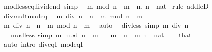 \begin{isabellebody}
\endisatagproof
{\isafoldproof}%
%
\isadelimproof
\isanewline
%
\endisadelimproof
\isanewline
{}\isamarkupfalse%
\ mod{\isacharunderscore}{\kern0pt}less{\isacharunderscore}{\kern0pt}eq{\isacharunderscore}{\kern0pt}dividend\ {\isacharbrackleft}{\kern0pt}simp{\isacharbrackright}{\kern0pt}{\isacharcolon}{\kern0pt}\isanewline
\ \ {\isachardoublequoteopen}m\ mod\ n\ {\isasymle}\ m{\isachardoublequoteclose}\ \ m\ n\ {\isacharcolon}{\kern0pt}{\isacharcolon}{\kern0pt}\ nat\isanewline
%
\isadelimproof
%
\endisadelimproof
%
\isatagproof
{}\isamarkupfalse%
\ {\isacharparenleft}{\kern0pt}rule\ add{\isacharunderscore}{\kern0pt}leD{}{\isacharparenright}{\kern0pt}\isanewline
\ \ \isamarkupfalse%
\ div{\isacharunderscore}{\kern0pt}mult{\isacharunderscore}{\kern0pt}mod{\isacharunderscore}{\kern0pt}eq\ \isamarkupfalse%
\ {\isachardoublequoteopen}m\ div\ n\ {\isacharasterisk}{\kern0pt}\ n\ {\isacharplus}{\kern0pt}\ m\ mod\ n\ {\isacharequal}{\kern0pt}\ m{\isachardoublequoteclose}\ \isacommand{{\isachardot}{\kern0pt}}\isamarkupfalse%
\isanewline
\ \ \isamarkupfalse%
\ \isamarkupfalse%
\ {\isachardoublequoteopen}m\ div\ n\ {\isacharasterisk}{\kern0pt}\ n\ {\isacharplus}{\kern0pt}\ m\ mod\ n\ {\isasymle}\ m{\isachardoublequoteclose}\ \isamarkupfalse%
\ auto\isanewline
{}\isamarkupfalse%
%
\endisatagproof
{\isafoldproof}%
%
\isadelimproof
\isanewline
%
\endisadelimproof
\isanewline
{}\isamarkupfalse%
\isanewline
\ \ div{\isacharunderscore}{\kern0pt}less\ {\isacharbrackleft}{\kern0pt}simp{\isacharbrackright}{\kern0pt}{\isacharcolon}{\kern0pt}\ {\isachardoublequoteopen}m\ div\ n\ {\isacharequal}{\kern0pt}\ {}{\isachardoublequoteclose}\isanewline
\ \ \ mod{\isacharunderscore}{\kern0pt}less\ {\isacharbrackleft}{\kern0pt}simp{\isacharbrackright}{\kern0pt}{\isacharcolon}{\kern0pt}\ {\isachardoublequoteopen}m\ mod\ n\ {\isacharequal}{\kern0pt}\ m{\isachardoublequoteclose}\isanewline
\ \ \ {\isachardoublequoteopen}m\ {\isacharless}{\kern0pt}\ n{\isachardoublequoteclose}\ \ m\ n\ {\isacharcolon}{\kern0pt}{\isacharcolon}{\kern0pt}\ nat\isanewline
%
\isadelimproof
\ \ %
\endisadelimproof
%
\isatagproof
{}\isamarkupfalse%
\ that\ \isamarkupfalse%
\ {\isacharparenleft}{\kern0pt}auto\ intro{\isacharcolon}{\kern0pt}\ div{\isacharunderscore}{\kern0pt}eqI\ mod{\isacharunderscore}{\kern0pt}eqI{\isacharparenright}{\kern0pt}%
\endisatagproof

\end{isabellebody}
